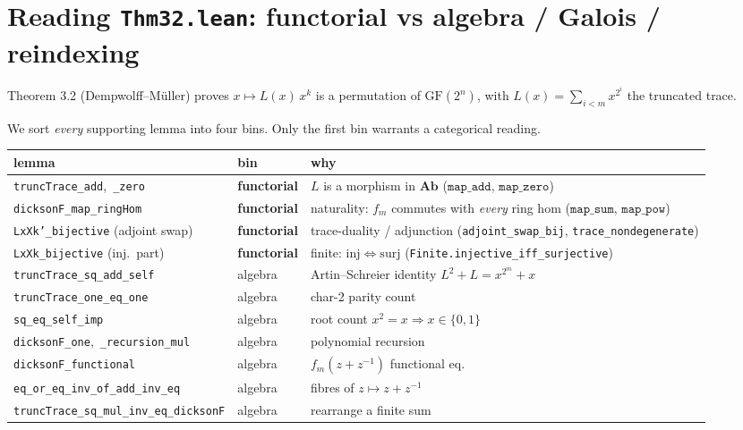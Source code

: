 \documentclass[11pt]{article}
\begin{document}
\section{Reading \texttt{Thm32.lean}: functorial vs algebra / Galois / reindexing}

Theorem 3.2 (Dempwolff--Müller) proves $x\mapsto L(x)\,x^{k}$ is a permutation
of $\mathrm{GF}(2^n)$, with $L(x)=\sum_{i<m}x^{2^i}$ the truncated trace.

We sort \emph{every} supporting lemma into four bins.
Only the first bin warrants a categorical reading.

\begin{center}\small
\renewcommand{\arraystretch}{1.25}
\begin{tabular}{@{}p{4.7cm} p{3.1cm} p{4.6cm}@{}}
\hline
\textbf{lemma} & \textbf{bin} & \textbf{why} \\
\hline
\rowcolor{blue!7}
\texttt{truncTrace\_add},\ \texttt{\_zero} & \textbf{functorial} & $L$ is a morphism in $\mathbf{Ab}$ ($\mathtt{map\_add}$, $\mathtt{map\_zero}$) \\
\rowcolor{blue!7}
\texttt{dicksonF\_map\_ringHom} & \textbf{functorial} & naturality: $f_m$ commutes with \emph{every} ring hom ($\mathtt{map\_sum}$, $\mathtt{map\_pow}$) \\
\rowcolor{blue!7}
\texttt{LxXk'\_bijective} (adjoint swap) & \textbf{functorial} & trace-duality / adjunction (\texttt{adjoint\_swap\_bij}, \texttt{trace\_nondegenerate}) \\
\rowcolor{blue!7}
\texttt{LxXk\_bijective} (inj.\ part) & \textbf{functorial} & finite: $\mathrm{inj}\Leftrightarrow\mathrm{surj}$ (\texttt{Finite.injective\_iff\_surjective}) \\
\hline
\texttt{truncTrace\_sq\_add\_self} & algebra & Artin--Schreier identity $L^2{+}L=x^{2^m}{+}x$ \\
\texttt{truncTrace\_one\_eq\_one} & algebra & char-2 parity count \\
\texttt{sq\_eq\_self\_imp} & algebra & root count $x^2{=}x\Rightarrow x\in\{0,1\}$ \\
\texttt{dicksonF\_one},\ \texttt{\_recursion\_mul} & algebra & polynomial recursion \\
\texttt{dicksonF\_functional} & algebra & $f_m(z{+}z^{-1})$ functional eq. \\
\texttt{eq\_or\_eq\_inv\_of\_add\_inv\_eq} & algebra & fibres of $z\mapsto z{+}z^{-1}$ \\
\texttt{truncTrace\_sq\_mul\_inv\_eq\_dicksonF} & algebra & rearrange a finite sum \\

\end{tabular}
\end{center}
\end{document}
